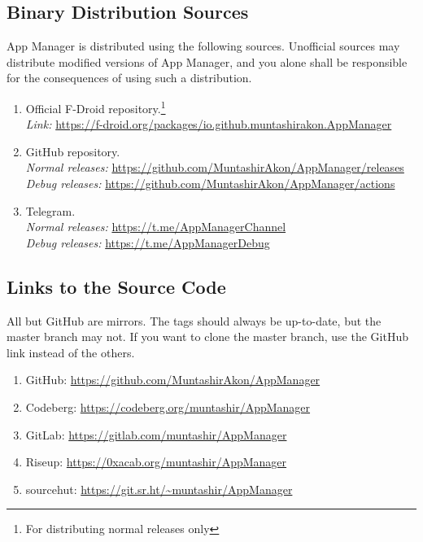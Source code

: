 \subsection{Binary Distribution Sources}\label{subsec:binary-distribution-sources} %
App Manager is distributed using the following sources. Unofficial sources may distribute modified versions of App
Manager, and you alone shall be responsible for the consequences of using such a distribution.
\begin{enumerate}
    \item Official F-Droid repository.\footnote{For distributing normal releases only}\\
    \textit{Link:} \url{https://f-droid.org/packages/io.github.muntashirakon.AppManager}
    \item GitHub repository.\\
    \textit{Normal releases:} \url{https://github.com/MuntashirAkon/AppManager/releases}\\
    \textit{Debug releases:} \url{https://github.com/MuntashirAkon/AppManager/actions}
    \item Telegram.\\
    \textit{Normal releases:} \url{https://t.me/AppManagerChannel}\\
    \textit{Debug releases:} \url{https://t.me/AppManagerDebug}
\end{enumerate}

\subsection{Links to the Source Code}\label{subsec:links-to-source-code} %
All but GitHub are mirrors. The tags should always be up-to-date, but the master branch may not.
If you want to clone the master branch, use the GitHub link instead of the others.
\begin{enumerate}
    \item GitHub: \url{https://github.com/MuntashirAkon/AppManager}
    \item Codeberg: \url{https://codeberg.org/muntashir/AppManager}
    \item GitLab: \url{https://gitlab.com/muntashir/AppManager}
    \item Riseup: \url{https://0xacab.org/muntashir/AppManager}
    \item sourcehut: \url{https://git.sr.ht/~muntashir/AppManager}
\end{enumerate}

